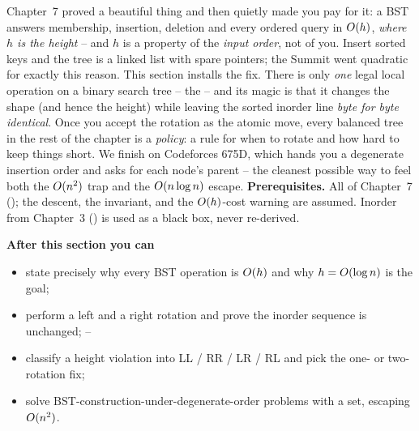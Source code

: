 \begin{topicintro}
Chapter~7 proved a beautiful thing and then quietly made you pay for it: a BST answers
membership, insertion, deletion and every ordered query in $O(h)$, \emph{where $h$ is the height}
-- and $h$ is a property of the \emph{input order}, not of you. Insert sorted keys and the tree is a
linked list with spare pointers; the Summit  went quadratic for exactly this
reason. This section installs the fix. There is only \emph{one} legal local operation on a binary
search tree -- the  -- and its magic is that it changes the shape (and hence the
height) while leaving the sorted inorder line \emph{byte for byte identical}. Once you accept the
rotation as the atomic move, every balanced tree in the rest of the chapter is a \emph{policy}: a
rule for when to rotate and how hard to keep things short. We finish on Codeforces 675D, which hands
you a degenerate insertion order and asks for each node's parent -- the cleanest possible way to feel
both the $O(n^2)$ trap and the $O(n\log n)$ escape.
\textbf{Prerequisites.} All of Chapter~7 (); the descent, the invariant, and the
$O(h)$-cost warning are assumed. Inorder from Chapter~3 () is used as a black box,
never re-derived.

\textbf{After this section you can}
\begin{itemize}[nosep]
  \item state precisely why every BST operation is $O(h)$ and why $h=O(\log n)$ is the goal; \hfill{}
  \item perform a left and a right rotation and prove the inorder sequence is unchanged; \hfill{}--
  \item classify a height violation into LL / RR / LR / RL and pick the one- or two-rotation fix; \hfill{}
  \item solve BST-construction-under-degenerate-order problems with a set, escaping $O(n^2)$. \hfill{}
\end{itemize}
\end{topicintro}

